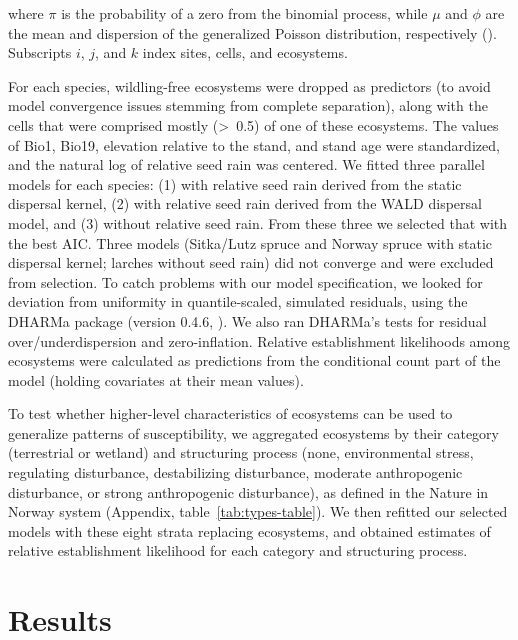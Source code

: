\documentclass[
]{article}
\begin{document}
where \(\pi\) is the probability of a zero from the binomial process, while \(\mu\)
and \(\phi\) are the mean and dispersion of the generalized Poisson distribution,
respectively (). Subscripts \(i\), \(j\), and
\(k\) index sites, cells, and ecosystems.

For each species, wildling-free ecosystems were dropped as predictors (to avoid
model convergence issues stemming from complete separation), along with the
cells that were comprised mostly (\textgreater~0.5) of one of these ecosystems. The values
of Bio1, Bio19, elevation relative to the stand, and stand age were
standardized, and the natural log of relative seed rain was centered. We fitted
three parallel models for each species: (1) with relative seed rain derived from
the static dispersal kernel, (2) with relative seed rain derived from the WALD
dispersal model, and (3) without relative seed rain. From these three we
selected that with the best AIC. Three models (Sitka/Lutz spruce and Norway
spruce with static dispersal kernel; larches without seed rain) did not converge
and were excluded from selection. To catch problems with our model
specification, we looked for deviation from uniformity in quantile-scaled,
simulated residuals, using the DHARMa package (version 0.4.6, ). We also ran DHARMa's tests for residual
over/underdispersion and zero-inflation. Relative establishment likelihoods
among ecosystems were calculated as predictions from the conditional count part
of the model (holding covariates at their mean values).

To test whether higher-level characteristics of ecosystems can be used to
generalize patterns of susceptibility, we aggregated ecosystems by their
category (terrestrial or wetland) and structuring process (none, environmental
stress, regulating disturbance, destabilizing disturbance, moderate
anthropogenic disturbance, or strong anthropogenic disturbance), as defined in
the Nature in Norway system (Appendix, table~\ref{tab:types-table}). We then
refitted our selected models with these eight strata replacing ecosystems, and
obtained estimates of relative establishment likelihood for each category and
structuring process.

\section{Results}\label{results}
\end{document}
